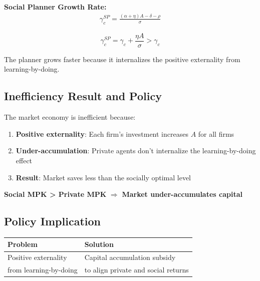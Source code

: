 \medskip
\noindent\textbf{Social Planner Growth Rate:}
\begin{align*}
\gamma_c^{SP} = \frac{(\alpha + \eta)A - \delta - \rho}{\sigma}
\tag{Planner Growth}
\end{align*}

\medskip
\begin{resultbox}
\[
\boxed{\gamma_c^{SP} = \gamma_c + \frac{\eta A}{\sigma} > \gamma_c}
\]
\end{resultbox}

\medskip
\begin{tcolorbox}[colback=orange!10,colframe=orange3,title=Result]
The planner grows faster because it internalizes the positive externality from learning-by-doing.
\end{tcolorbox}

\clearpage

\subsection*{Inefficiency Result and Policy}

\begin{derivationbox}
The market economy is inefficient because:

\begin{enumerate}
    \item \textbf{Positive externality}: Each firm's investment increases $A$ for all firms
    \item \textbf{Under-accumulation}: Private agents don't internalize the learning-by-doing effect
    \item \textbf{Result}: Market saves less than the socially optimal level
\end{enumerate}
\end{derivationbox}

\begin{resultbox}
\begin{center}
\textbf{Social MPK > Private MPK} $\Rightarrow$ \textbf{Market under-accumulates capital}
\end{center}
\end{resultbox}

\medskip
\subsection*{Policy Implication}

\begin{center}
\begin{tabular}{ll}
\toprule
\textbf{Problem} & \textbf{Solution} \\
\midrule
Positive externality & Capital accumulation subsidy \\
from learning-by-doing & to align private and social returns \\
\bottomrule
\end{tabular}
\end{center}

